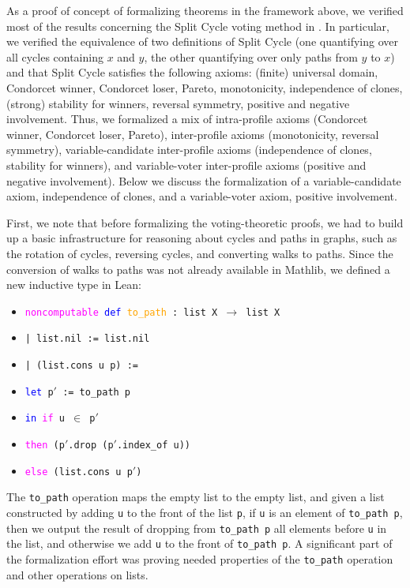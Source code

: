 \documentclass[runningheads]{llncs}
\begin{document}
As a proof of concept of formalizing theorems in the framework above, we verified most of the results concerning the Split Cycle voting method in \cite{HP2020}. In particular, we verified the equivalence of two definitions of Split Cycle (one quantifying over all cycles containing $x$ and $y$, the other quantifying over only paths from $y$ to $x$) and that Split Cycle satisfies the following axioms: (finite) universal domain, Condorcet winner, Condorcet loser, Pareto, monotonicity, independence of clones, (strong) stability for winners, reversal symmetry, positive and negative involvement. Thus, we formalized a mix of intra-profile axioms (Condorcet winner, Condorcet loser, Pareto), inter-profile axioms (monotonicity, reversal symmetry), variable-candidate inter-profile axioms (independence of clones, stability for winners), and variable-voter inter-profile axioms (positive and negative involvement). Below we discuss the formalization of a variable-candidate axiom, independence of clones, and a variable-voter axiom, positive involvement.

First, we note that before formalizing the voting-theoretic proofs, we had to build up a basic infrastructure for reasoning about cycles and paths in graphs, such as the rotation of cycles, reversing cycles, and converting walks to paths. Since the conversion of walks to paths was not already available in Mathlib, we defined a new inductive type in Lean:
\begin{itemize}
\item[] \texttt{\textcolor{magenta}{noncomputable} \textcolor{blue}{def} \textcolor{orange}{to\_path} : list X $\to$ list X}
\item[] \texttt{| list.nil := list.nil}
\item[] \texttt{| (list.cons u p) :=}
\item[]    \quad\texttt{\textcolor{blue}{let} p$'$ := to\_path p}
\item[]    \quad\texttt{\textcolor{blue}{in} \textcolor{magenta}{if} u $\in$ p$'$}
 \item[]     \qquad  \texttt{\textcolor{magenta}{then} (p$'$.drop (p$'$.index\_of u))}
 \item[]       \qquad \texttt{\textcolor{magenta}{else} (list.cons u p$'$)}
 \end{itemize}
The \texttt{to\_path} operation maps the empty list to the empty list, and given a list constructed by adding \texttt{u} to the front of the list \texttt{p},  if \texttt{u} is an element of \texttt{to\_path p}, then we output the result of dropping from \texttt{to\_path p} all elements before \texttt{u} in the list, and otherwise we add \texttt{u} to the front of \texttt{to\_path p}. A significant part of the formalization effort was proving needed properties of the \texttt{to\_path} operation and other operations on lists.
\end{document}
